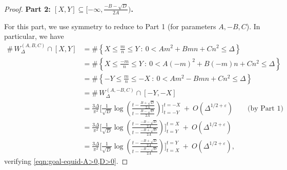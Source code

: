 \documentclass[11pt,letterpaper,reqno]{amsart}
\numberwithin{equation}{section}
\numberwithin{figure}{section}
\numberwithin{table}{section}
\newcommand{\lrp}[1]{\left(#1\right)}
\newcommand{\lrcb}[1]{\left\{#1\right\}}
\begin{document}
\begin{proof}



\noindent
\textbf{Part 2: $[X,Y] \subseteq [-\infty, \frac{-B-\sqrt{D}}{2A})$. }

For this part, we use symmetry to reduce to Part 1 (for parameters $A,-B,C$). In particular, we have 
\begin{align}
    \#\, W_{\Delta}^{(A,B,C)} \cap [X,Y] 
    &= \#\lrcb{X \le \frac{m}{n} \le Y ~:~   0 < A m^2 + B mn + C n^2  \le \Delta
    } \\
    &= \#\lrcb{X \le \frac{-m}{n} \le Y ~:~  0 < A (-m)^2 + B (-m)n + Cn^2  \le \Delta
    } \\
    &= \#\lrcb{-Y \le \frac{m}{n} \le -X ~:~  0 < A m^2 - B mn + C n^2  \le \Delta
    } \\
    &= \#\, W_{\Delta}^{(A,-B,C)} \cap [-Y,-X] \\
    &= \frac{3\Delta}{\pi^2}
    \Bigg[ 
        \frac{1}{\sqrt D}
        \log\lrp{
        \frac{
            t - \frac{B+\sqrt{D}}{2A}
        }{
            t - \frac{B-\sqrt{D}}{2A}
        }
        }
    \Bigg]_{t=-Y}^{t=-X} 
         ~+~ O(\Delta^{1/2+\varepsilon}) \qquad \text{(by Part 1)} \\
    &= \frac{3\Delta}{\pi^2}
    \Bigg[ 
        \frac{1}{\sqrt D}
        \log\lrp{
        \frac{
            t - \frac{-B-\sqrt{D}}{2A}
        }{
            t - \frac{-B+\sqrt{D}}{2A}
        }
        }
    \Bigg]_{t=Y}^{t=X} 
         ~+~ O(\Delta^{1/2+\varepsilon})  \\
    &= \frac{3\Delta}{\pi^2}
    \Bigg[ 
        \frac{1}{\sqrt D}
        \log\lrp{
        \frac{
            t - \frac{-B+\sqrt{D}}{2A}
        }{
            t - \frac{-B-\sqrt{D}}{2A}
        }
        }
    \Bigg]_{t=X}^{t=Y} 
         ~+~ O(\Delta^{1/2+\varepsilon}),
\end{align}
verifying \eqref{eqn:goal-equid-A>0,D>0}.
\end{proof}
\end{document}
